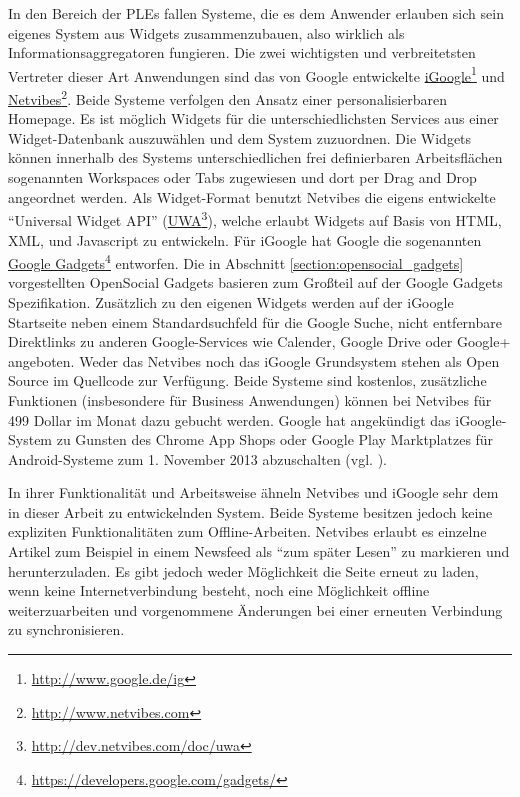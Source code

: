 In den Bereich der PLEs fallen Systeme, die es dem Anwender erlauben sich sein eigenes System aus Widgets zusammenzubauen, also wirklich als Informationsaggregatoren fungieren. Die zwei wichtigsten und verbreitetsten Vertreter dieser Art Anwendungen sind das von Google entwickelte \href{http://www.google.de/ig}{iGoogle}\footnote{\url{http://www.google.de/ig}} und \href{http://www.netvibes.com}{Netvibes}\footnote{\url{http://www.netvibes.com}}. Beide Systeme verfolgen den Ansatz einer personalisierbaren Homepage. Es ist möglich Widgets für die unterschiedlichsten Services aus einer Widget-Datenbank auszuwählen und dem System zuzuordnen. Die Widgets können innerhalb des Systems unterschiedlichen frei definierbaren Arbeitsflächen sogenannten Workspaces oder Tabs zugewiesen und dort per Drag and Drop angeordnet werden. Als Widget-Format benutzt Netvibes die eigens entwickelte "`Universal Widget API"' (\href{http://dev.netvibes.com/doc/uwa}{UWA}\footnote{\url{http://dev.netvibes.com/doc/uwa}}), welche erlaubt Widgets auf Basis von HTML, XML, und Javascript zu entwickeln. Für iGoogle hat Google die sogenannten \href{https://developers.google.com/gadgets/}{Google Gadgets}\footnote{\url{https://developers.google.com/gadgets/}} entworfen. Die in Abschnitt \ref{section:opensocial_gadgets} vorgestellten OpenSocial Gadgets basieren zum Großteil auf der Google Gadgets Spezifikation. Zusätzlich zu den eigenen Widgets werden auf der iGoogle Startseite neben einem Standardsuchfeld für die Google Suche, nicht entfernbare Direktlinks zu anderen Google-Services wie Calender, Google Drive oder Google+ angeboten. Weder das Netvibes noch das iGoogle Grundsystem stehen als Open Source im Quellcode zur Verfügung. Beide Systeme sind kostenlos, zusätzliche Funktionen (insbesondere für Business Anwendungen) können bei Netvibes für 499 Dollar im Monat dazu gebucht werden. Google hat angekündigt das iGoogle-System zu Gunsten des Chrome App Shops oder Google Play Marktplatzes für Android-Systeme zum 1. November 2013 abzuschalten (vgl. \cite{Google2012}).

In ihrer Funktionalität und Arbeitsweise ähneln Netvibes und iGoogle sehr dem in dieser Arbeit zu entwickelnden System. Beide Systeme besitzen jedoch keine expliziten Funktionalitäten zum Offline-Arbeiten. Netvibes erlaubt es einzelne Artikel zum Beispiel in einem Newsfeed als "`zum später Lesen"' zu markieren und herunterzuladen. Es gibt jedoch weder Möglichkeit die Seite erneut zu laden, wenn keine Internetverbindung besteht, noch eine Möglichkeit offline weiterzuarbeiten und vorgenommene Änderungen bei einer erneuten Verbindung zu synchronisieren. 